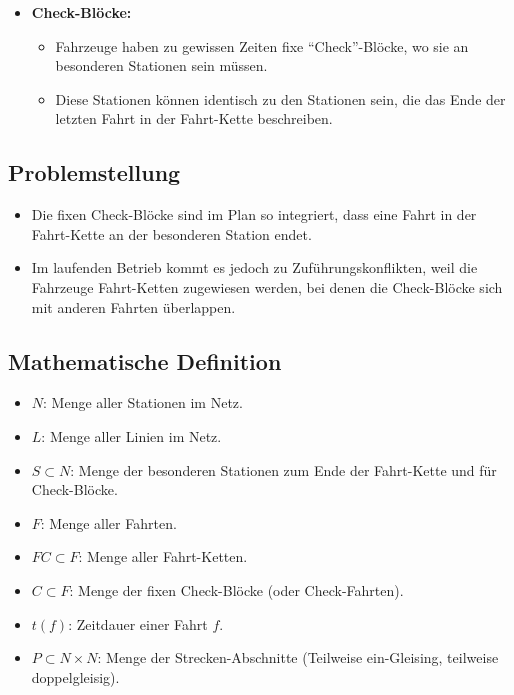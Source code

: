 \begin{itemize}
    \item \textbf{Check-Blöcke:}
    \begin{itemize}
        \item Fahrzeuge haben zu gewissen Zeiten fixe ``Check''-Blöcke, wo sie an besonderen Stationen sein müssen.
        \item Diese Stationen können identisch zu den Stationen sein, die das Ende der letzten Fahrt in der Fahrt-Kette beschreiben.
    \end{itemize}
\end{itemize}

\subsection*{Problemstellung}

\begin{itemize}
    \item Die fixen Check-Blöcke sind im Plan so integriert, dass eine Fahrt in der Fahrt-Kette an der besonderen Station endet.
    \item Im laufenden Betrieb kommt es jedoch zu Zuführungskonflikten, weil die Fahrzeuge Fahrt-Ketten zugewiesen werden, bei denen die Check-Blöcke sich mit anderen Fahrten überlappen.
\end{itemize}

\subsection*{Mathematische Definition}

\begin{itemize}
    \item $N$: Menge aller Stationen im Netz.
    \item $L$: Menge aller Linien im Netz.
    \item $S \subset N$: Menge der besonderen Stationen zum Ende der Fahrt-Kette und für Check-Blöcke.
    \item $F$: Menge aller Fahrten.
    \item $FC \subset F$: Menge aller Fahrt-Ketten.
    \item $C \subset F$: Menge der fixen Check-Blöcke (oder Check-Fahrten).
    \item $t(f)$: Zeitdauer einer Fahrt $f$.
    \item $P \subset N \times N$: Menge der Strecken-Abschnitte (Teilweise ein-Gleising, teilweise doppelgleisig).
\end{itemize}

